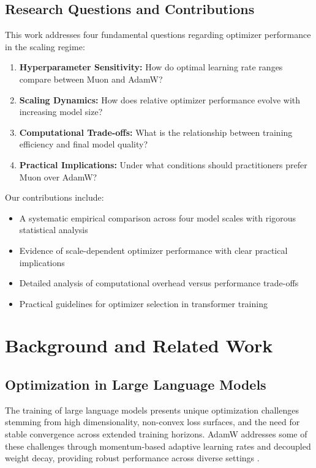 \documentclass[11pt,a4paper]{article}
\begin{document}
\subsection{Research Questions and Contributions}

This work addresses four fundamental questions regarding optimizer performance in the scaling regime:

\begin{enumerate}[leftmargin=*]
    \item \textbf{Hyperparameter Sensitivity:} How do optimal learning rate ranges compare between Muon and AdamW?
    \item \textbf{Scaling Dynamics:} How does relative optimizer performance evolve with increasing model size?
    \item \textbf{Computational Trade-offs:} What is the relationship between training efficiency and final model quality?
    \item \textbf{Practical Implications:} Under what conditions should practitioners prefer Muon over AdamW?
\end{enumerate}

Our contributions include:
\begin{itemize}[leftmargin=*]
    \item A systematic empirical comparison across four model scales with rigorous statistical analysis
    \item Evidence of scale-dependent optimizer performance with clear practical implications
    \item Detailed analysis of computational overhead versus performance trade-offs
    \item Practical guidelines for optimizer selection in transformer training
\end{itemize}

\section{Background and Related Work}

\subsection{Optimization in Large Language Models}

The training of large language models presents unique optimization challenges stemming from high dimensionality, non-convex loss surfaces, and the need for stable convergence across extended training horizons. AdamW addresses some of these challenges through momentum-based adaptive learning rates and decoupled weight decay, providing robust performance across diverse settings \cite{loshchilov2017decoupled}.
\end{document}
